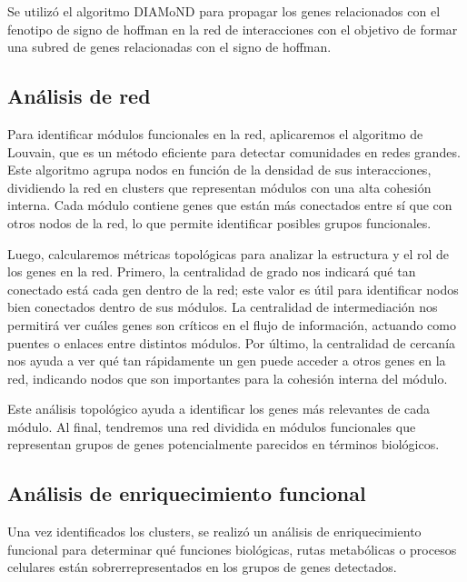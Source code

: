 Se utilizó el algoritmo DIAMoND para propagar los genes relacionados con el fenotipo de signo de hoffman en la red de interacciones con el objetivo de formar una subred de genes relacionadas con el signo de hoffman.

\subsection{Análisis de red}

Para identificar módulos funcionales en la red, aplicaremos el algoritmo de Louvain, que es un método eficiente para detectar comunidades en redes grandes. Este algoritmo agrupa nodos en función de la densidad de sus interacciones, dividiendo la red en clusters que representan módulos con una alta cohesión interna. Cada módulo contiene genes que están más conectados entre sí que con otros nodos de la red, lo que permite identificar posibles grupos funcionales.

Luego, calcularemos métricas topológicas para analizar la estructura y el rol de los genes en la red. Primero, la centralidad de grado nos indicará qué tan conectado está cada gen dentro de la red; este valor es útil para identificar nodos bien conectados dentro de sus módulos. La centralidad de intermediación nos permitirá ver cuáles genes son críticos en el flujo de información, actuando como puentes o enlaces entre distintos módulos. Por último, la centralidad de cercanía nos ayuda a ver qué tan rápidamente un gen puede acceder a otros genes en la red, indicando nodos que son importantes para la cohesión interna del módulo.

Este análisis topológico ayuda a identificar los genes más relevantes de cada módulo. Al final, tendremos una red dividida en módulos funcionales que representan grupos de genes potencialmente parecidos en términos biológicos.

\subsection{Análisis de enriquecimiento funcional}

Una vez identificados los clusters, se realizó un análisis de enriquecimiento funcional para determinar qué funciones biológicas, rutas metabólicas o procesos celulares están sobrerrepresentados en los grupos de genes detectados.